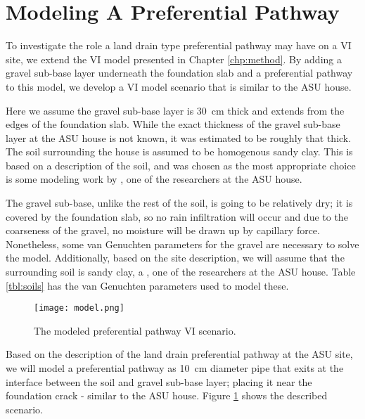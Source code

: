 \section{Modeling A Preferential Pathway}

To investigate the role a land drain type preferential pathway may have on a VI site, we extend the VI model presented in Chapter \ref{chp:method}.
By adding a gravel sub-base layer underneath the foundation slab and a preferential pathway to this model, we develop a VI model scenario that is similar to the ASU house.\par

Here we assume the gravel sub-base layer is \SI{30}{\centi\metre} thick and extends from the edges of the foundation slab.
While the exact thickness of the gravel sub-base layer at the ASU house is not known, it was estimated to be roughly that thick.
The soil surrounding the house is assumed to be homogenous sandy clay.
This is based on a description of the soil, and was chosen as the most appropriate choice is some modeling work  by \citeauthor{guo_vapor_2015}\cite{guo_vapor_2015}, one of the researchers at the ASU house.\par

The gravel sub-base, unlike the rest of the soil, is going to be relatively dry; it is covered by the foundation slab, so no rain infiltration will occur and due to the coarseness of the gravel, no moisture will be drawn up by capillary force.
Nonetheless, some van Genuchten parameters for the gravel are necessary to solve the model.
Additionally, based on the site description, we will assume that the surrounding soil is sandy clay, a , one of the researchers at the ASU house.
Table \ref{tbl:soils} has the van Genuchten parameters used to model these.\par

\begin{figure}[hbt!]
  \centering
  \texttt{[image: model.png]}
  \caption{The modeled preferential pathway VI scenario.}
  \label{fig:model_preferential_pathway}
\end{figure}

Based on the description of the land drain preferential pathway at the ASU site, we will model a preferential pathway as \SI{10}{\centi\metre} diameter pipe that exits at the interface between the soil and gravel sub-base layer; placing it near the foundation crack - similar to the ASU house\cite{guo_identification_2015}.
Figure \ref{fig:model_preferential_pathway} shows the described scenario.\par


